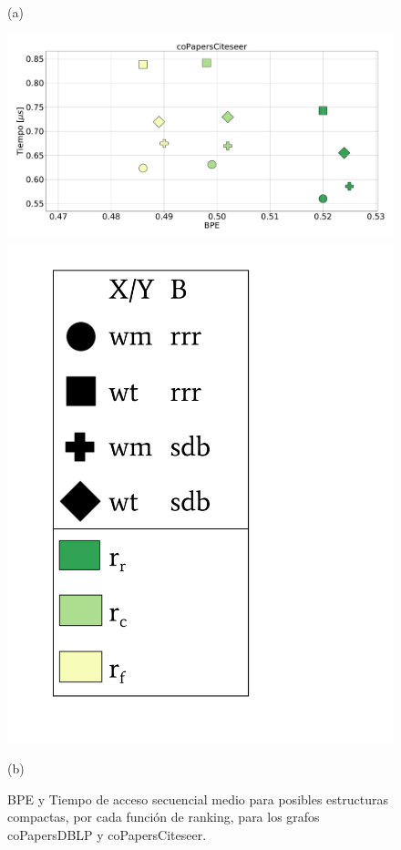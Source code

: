 \begin{figure}
\begin{minipage}{1\textwidth}
    			(a)		
    	\end{minipage}
    	
       	\begin{minipage}{1\textwidth}
    			\centering
    			\begin{minipage}{0.8\textwidth}
    				\centering
    				\includegraphics[width=1\linewidth]{img/sdsl/secuencialBig/coPapersCiteseer.pdf}
    			\end{minipage}
    			\begin{minipage}{0.15\textwidth}
    				\centering
    				\includegraphics[scale=.22, clip, trim=70 0 0 0]{img/sdsl/label.pdf}
    			\end{minipage}
    			
    			(b)		
    	\end{minipage}
    	
    \caption{BPE y Tiempo de acceso secuencial medio para posibles estructuras compactas, por cada función de ranking, para los grafos coPapersDBLP y coPapersCiteseer.}
    \label{fig:sdslBPE5}
\end{figure}
